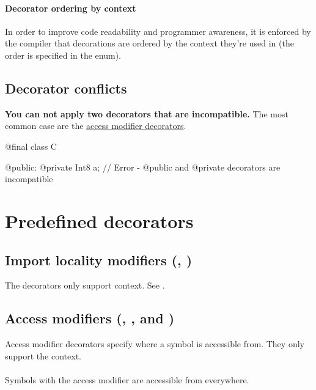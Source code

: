 \paragraph{Decorator ordering by context} In order to improve code readability and programmer awareness, it is enforced by the compiler that decorations are ordered by the context they're used in (the order is specified in the  enum).

\subsection{Decorator conflicts}
\textbf{You can not apply two decorators that are incompatible.} The most common case are the \hyperref[accessModifierDecorators]{access modifier decorators}.
\begin{code}
@final class C {

@public:
	@private Int8 a; // Error - @public and @private decorators are incompatible
	
}
\end{code}

\section{Predefined decorators}

\subsection{Import locality modifiers (, )}
The decorators only support  context. See .

\subsection{Access modifiers (, ,  and )} \label{accessModifierDecorators}
Access modifier decorators specify where a symbol is accessible from. They only support the  context.

\paragraph{} \label{decorator:public} Symbols with the  access modifier are accessible from everywhere.

